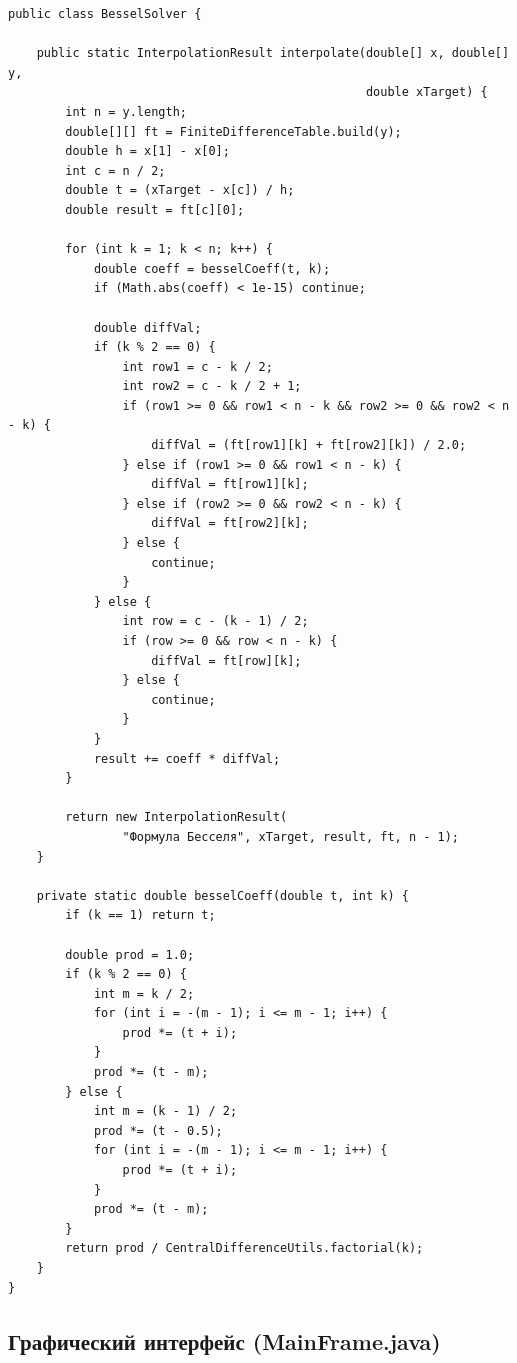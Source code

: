 \begin{lstlisting}[style=javaStyle, label=code:bessel]
public class BesselSolver {

    public static InterpolationResult interpolate(double[] x, double[] y,
                                                  double xTarget) {
        int n = y.length;
        double[][] ft = FiniteDifferenceTable.build(y);
        double h = x[1] - x[0];
        int c = n / 2;
        double t = (xTarget - x[c]) / h;
        double result = ft[c][0];

        for (int k = 1; k < n; k++) {
            double coeff = besselCoeff(t, k);
            if (Math.abs(coeff) < 1e-15) continue;

            double diffVal;
            if (k % 2 == 0) {
                int row1 = c - k / 2;
                int row2 = c - k / 2 + 1;
                if (row1 >= 0 && row1 < n - k && row2 >= 0 && row2 < n - k) {
                    diffVal = (ft[row1][k] + ft[row2][k]) / 2.0;
                } else if (row1 >= 0 && row1 < n - k) {
                    diffVal = ft[row1][k];
                } else if (row2 >= 0 && row2 < n - k) {
                    diffVal = ft[row2][k];
                } else {
                    continue;
                }
            } else {
                int row = c - (k - 1) / 2;
                if (row >= 0 && row < n - k) {
                    diffVal = ft[row][k];
                } else {
                    continue;
                }
            }
            result += coeff * diffVal;
        }

        return new InterpolationResult(
                "Формула Бесселя", xTarget, result, ft, n - 1);
    }

    private static double besselCoeff(double t, int k) {
        if (k == 1) return t;

        double prod = 1.0;
        if (k % 2 == 0) {
            int m = k / 2;
            for (int i = -(m - 1); i <= m - 1; i++) {
                prod *= (t + i);
            }
            prod *= (t - m);
        } else {
            int m = (k - 1) / 2;
            prod *= (t - 0.5);
            for (int i = -(m - 1); i <= m - 1; i++) {
                prod *= (t + i);
            }
            prod *= (t - m);
        }
        return prod / CentralDifferenceUtils.factorial(k);
    }
}
\end{lstlisting}

\subsection{Графический интерфейс (MainFrame.java)}

